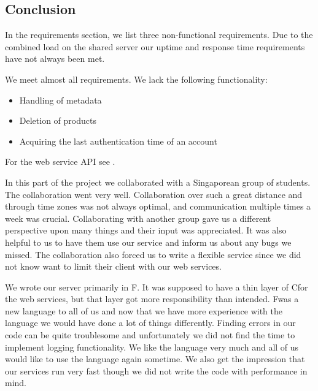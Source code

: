 \subsection{Conclusion}
\label{serverconclusion}
In the requirements section, we list three non-functional requirements. Due to the combined load on the shared server our uptime and response time requirements have not always been met.

We meet almost all requirements. We lack the following functionality:
\begin{itemize}
\item Handling of metadata
\item Deletion of products
\item Acquiring the last authentication time of an account
\end{itemize}
\mbox{}For the web service API see .

In this part of the project we collaborated with a Singaporean group of students. The collaboration went very well. Collaboration over such a great distance and through time zones was not always optimal, and communication multiple times a week was crucial.
Collaborating with another group gave us a different perspective upon many things and their input was appreciated. It was also helpful to us to have them use our service and inform us about any bugs we missed.
The collaboration also forced us to write a flexible service since we did not know want to limit their client with our web services.

We wrote our server primarily in F\Sh. It was supposed to have a thin layer of C\Sh for the web services, but that layer got more responsibility than intended. 
F\Sh was a new language to all of us and now that we have more experience with the language we would have done a lot of things differently. Finding errors in our code can be quite troublesome and unfortunately we did not find the time to implement logging functionality. We like the language very much and all of us would like to use the language again sometime. We also get the impression that our services run very fast though we did not write the code with performance in mind.
\newpage
